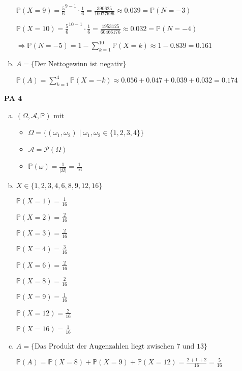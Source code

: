 \documentclass[a4paper,12pt]{article}
\newcommand{\PAufgabe}[1]{
        {
        \vspace*{0.5cm}
        \textbf{PA #1}
        \vspace*{0.2cm}
    }
}
\begin{document}
\begin{enumerate}[(a)]
        $ \displaystyle \mathbb{P}(X = 9) = \frac{5}{6}^{9 - 1} \cdot \frac{1}{6} = \frac{390625}{10077696} \approx 0.039 = \mathbb{P}(N = -3)$

        $ \displaystyle \mathbb{P}(X = 10) = \frac{5}{6}^{10 - 1} \cdot \frac{1}{6} = \frac{1953125}{60466176} \approx 0.032 = \mathbb{P}(N = -4) $

        $ \Rightarrow \mathbb{P}(N = -5) = 1 - \sum\limits_{k = 1}^{10} \mathbb{P}(X = k) \approx 1 - 0.839 = 0.161 $

        \item

        $ A = \{\text{Der Nettogewinn ist negativ}\} $

        $ \mathbb{P}(A) = \sum\limits_{k = 1}^{4} \mathbb{P}(X = -k) \approx 0.056 + 0.047 + 0.039 + 0.032 =  0.174 $
    \end{enumerate}

    \newpage

    \PAufgabe{4}
    \begin{enumerate}[(a)]
        \item 

        $ (\Omega, \mathcal{A}, \mathbb{P}) $ mit
        \begin{itemize}
            \item $ \Omega = \{(\omega_1, \omega_2) \mid \omega_1, \omega_2 \in \{1, 2, 3, 4\}\} $
            \item $ \mathcal{A} = \mathcal{P}(\Omega) $
            \item $ \mathbb{P}(\omega) = \frac{1}{|\Omega|} = \frac{1}{16} $
        \end{itemize}

        \item

        $ X \in \{1, 2, 3, 4, 6, 8, 9, 12, 16\} $

        $ \mathbb{P}(X = 1) = \frac{1}{16} $

        $ \mathbb{P}(X = 2) = \frac{2}{16} $

        $ \mathbb{P}(X = 3) = \frac{2}{16} $

        $ \mathbb{P}(X = 4) = \frac{3}{16} $

        $ \mathbb{P}(X = 6) = \frac{2}{16} $

        $ \mathbb{P}(X = 8) = \frac{2}{16} $

        $ \mathbb{P}(X = 9) = \frac{1}{16} $

        $ \mathbb{P}(X = 12) = \frac{2}{16} $

        $ \mathbb{P}(X = 16) = \frac{1}{16} $

        \item

        $ A = \{\text{Das Produkt der Augenzahlen liegt zwischen 7 und 13}\} $ 

        $ \mathbb{P}(A) = \mathbb{P}(X = 8) + \mathbb{P}(X = 9) + \mathbb{P}(X = 12) = \frac{2 + 1 + 2}{16} = \frac{5}{16} $

    \end{enumerate}
\end{document}
